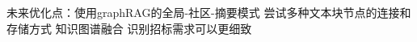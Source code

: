 \documentclass{xmu}
\begin{document}
未来优化点：使用graphRAG的全局-社区-摘要模式
尝试多种文本块节点的连接和存储方式
知识图谱融合
识别招标需求可以更细致
\end{document}
